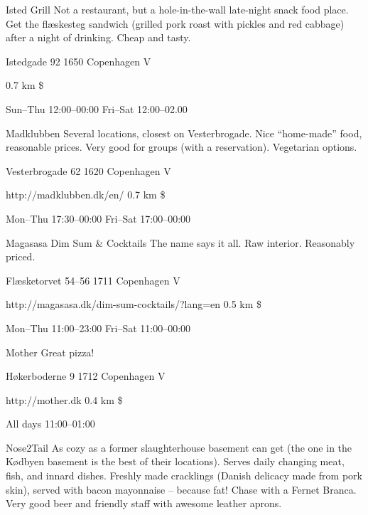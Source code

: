 \begin{left}
\begin{eventitem}
\begin{eventitem}
\begin{eventitem}
\begin{fooditemwourl}
{Isted Grill}
{Not a restaurant, but a hole-in-the-wall late-night snack food place. Get the flæskesteg sandwich (grilled pork roast with pickles and red cabbage) after a night of drinking. Cheap and tasty.}
{\begin{addr}
{Istedgade 92}
{1650 Copenhagen V}
\end{addr}}
{0.7 km}
{\$}
{\begin{ohours}
{Sun–Thu}
{12:00–00:00}
{Fri–Sat}
{12:00–02.00}
{}
{}
{}
{}
\end{ohours}}
\end{fooditemwourl}
\begin{fooditem}
{Madklubben}
{Several locations, closest on Vesterbrogade. Nice “home-made” food, reasonable prices. Very good for groups (with a reservation). Vegetarian options. }
{\begin{addr}
{Vesterbrogade 62}
{1620 Copenhagen V}
\end{addr}}
{http://madklubben.dk/en/ }
{0.7 km}
{\$}
{\begin{ohours}
{Mon–Thu}
{17:30–00:00}
{Fri–Sat}
{17:00–00:00}
{}
{}
{}
{}
\end{ohours}}
\end{fooditem}
\begin{fooditem}
{Magasasa Dim Sum \& Cocktails}
{The name says it all. Raw interior. Reasonably priced. }
{\begin{addr}
{Flæsketorvet 54--56}
{1711 Copenhagen V}
\end{addr}}
{http://magasasa.dk/dim-sum-cocktails/?lang=en}
{0.5 km}
{\$}
{\begin{ohours}
{Mon–Thu}
{11:00–23:00}
{Fri–Sat}
{11:00–00:00}
{}
{}
{}
{}
\end{ohours}}
\end{fooditem}
\begin{fooditem}
{Mother}
{Great pizza!}
{\begin{addr}
{Høkerboderne 9}
{1712 Copenhagen V}
\end{addr}}
{http://mother.dk}
{0.4 km}
{\$}
{\begin{ohours}
{All days}
{11:00–01:00}
{}
{}
{}
{}
{}
{}
\end{ohours}}
\end{fooditem}
\begin{fooditem}
{Nose2Tail}
{As cozy as a former slaughterhouse basement can get (the one in the Kødbyen basement is the best of their locations). Serves daily changing meat, fish, and innard dishes. Freshly made cracklings (Danish delicacy made from pork skin), served with bacon mayonnaise – because fat! Chase with a Fernet Branca. Very good beer and friendly staff with awesome leather aprons.}

\end{fooditem}
\end{eventitem}
\end{eventitem}
\end{eventitem}
\end{left}
